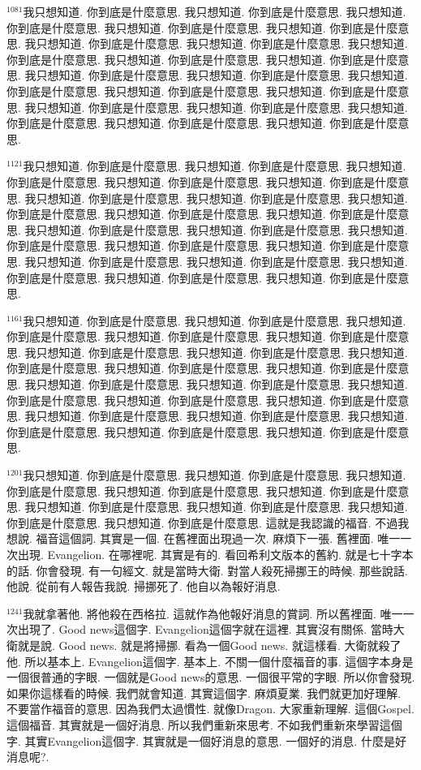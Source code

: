 \documentclass{book}
\begin{document}
$^{1081}$我只想知道.
你到底是什麼意思.
我只想知道.
你到底是什麼意思.
我只想知道.
你到底是什麼意思.
我只想知道.
你到底是什麼意思.
我只想知道.
你到底是什麼意思.
我只想知道.
你到底是什麼意思.
我只想知道.
你到底是什麼意思.
我只想知道.
你到底是什麼意思.
我只想知道.
你到底是什麼意思.
我只想知道.
你到底是什麼意思.
我只想知道.
你到底是什麼意思.
我只想知道.
你到底是什麼意思.
我只想知道.
你到底是什麼意思.
我只想知道.
你到底是什麼意思.
我只想知道.
你到底是什麼意思.
我只想知道.
你到底是什麼意思.
我只想知道.
你到底是什麼意思.
我只想知道.
你到底是什麼意思.
我只想知道.
你到底是什麼意思.
我只想知道.
你到底是什麼意思.

$^{1121}$我只想知道.
你到底是什麼意思.
我只想知道.
你到底是什麼意思.
我只想知道.
你到底是什麼意思.
我只想知道.
你到底是什麼意思.
我只想知道.
你到底是什麼意思.
我只想知道.
你到底是什麼意思.
我只想知道.
你到底是什麼意思.
我只想知道.
你到底是什麼意思.
我只想知道.
你到底是什麼意思.
我只想知道.
你到底是什麼意思.
我只想知道.
你到底是什麼意思.
我只想知道.
你到底是什麼意思.
我只想知道.
你到底是什麼意思.
我只想知道.
你到底是什麼意思.
我只想知道.
你到底是什麼意思.
我只想知道.
你到底是什麼意思.
我只想知道.
你到底是什麼意思.
我只想知道.
你到底是什麼意思.
我只想知道.
你到底是什麼意思.
我只想知道.
你到底是什麼意思.

$^{1161}$我只想知道.
你到底是什麼意思.
我只想知道.
你到底是什麼意思.
我只想知道.
你到底是什麼意思.
我只想知道.
你到底是什麼意思.
我只想知道.
你到底是什麼意思.
我只想知道.
你到底是什麼意思.
我只想知道.
你到底是什麼意思.
我只想知道.
你到底是什麼意思.
我只想知道.
你到底是什麼意思.
我只想知道.
你到底是什麼意思.
我只想知道.
你到底是什麼意思.
我只想知道.
你到底是什麼意思.
我只想知道.
你到底是什麼意思.
我只想知道.
你到底是什麼意思.
我只想知道.
你到底是什麼意思.
我只想知道.
你到底是什麼意思.
我只想知道.
你到底是什麼意思.
我只想知道.
你到底是什麼意思.
我只想知道.
你到底是什麼意思.
我只想知道.
你到底是什麼意思.

$^{1201}$我只想知道.
你到底是什麼意思.
我只想知道.
你到底是什麼意思.
我只想知道.
你到底是什麼意思.
我只想知道.
你到底是什麼意思.
我只想知道.
你到底是什麼意思.
我只想知道.
你到底是什麼意思.
我只想知道.
你到底是什麼意思.
我只想知道.
你到底是什麼意思.
我只想知道.
你到底是什麼意思.
這就是我認識的福音.
不過我想說.
福音這個詞.
其實是一個.
在舊裡面出現過一次.
麻煩下一張.
舊裡面.
唯一一次出現.
Evangelion.
在哪裡呢.
其實是有的.
看回希利文版本的舊約.
就是七十字本的話.
你會發現.
有一句經文.
就是當時大衛.
對當人殺死掃挪王的時候.
那些說話.
他說.
從前有人報告我說.
掃挪死了.
他自以為報好消息.

$^{1241}$我就拿著他.
將他殺在西格拉.
這就作為他報好消息的賞詞.
所以舊裡面.
唯一一次出現了.
Good news這個字.
Evangelion這個字就在這裡.
其實沒有關係.
當時大衛就是說.
Good news.
就是將掃挪.
看為一個Good news.
就這樣看.
大衛就殺了他.
所以基本上.
Evangelion這個字.
基本上.
不關一個什麼福音的事.
這個字本身是一個很普通的字眼.
一個就是Good news的意思.
一個很平常的字眼.
所以你會發現.
如果你這樣看的時候.
我們就會知道.
其實這個字.
麻煩夏業.
我們就更加好理解.
不要當作福音的意思.
因為我們太過慣性.
就像Dragon.
大家重新理解.
這個Gospel.
這個福音.
其實就是一個好消息.
所以我們重新來思考.
不如我們重新來學習這個字.
其實Evangelion這個字.
其實就是一個好消息的意思.
一個好的消息.
什麼是好消息呢?.
\end{document}
